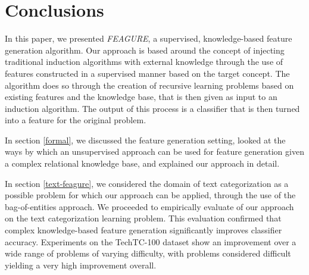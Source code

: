 \documentclass{article}
\theoremstyle{definition}
\begin{document}



\section{Conclusions}

In this paper, we presented \emph{FEAGURE}, a supervised, knowledge-based feature generation algorithm. Our approach is based around the concept of injecting traditional induction algorithms with external knowledge through the use of features constructed in a supervised manner based on the target concept. 
The algorithm does so through the creation of recursive learning problems based on existing features and the knowledge base, that is then given as input to an induction algorithm. The output of this process is a classifier that is then turned into a feature for the original problem.

In section \ref{formal}, we discussed the feature generation setting, looked at the ways by which an unsupervised approach can be used for feature generation given a complex relational knowledge base, and explained our approach in detail.

In section \ref{text-feagure}, we considered the domain of text categorization as a possible problem for which our approach can be applied, through the use of the bag-of-entities approach. We proceeded to empirically evaluate of our approach on the text categorization learning problem.
This evaluation confirmed that complex knowledge-based feature generation significantly improves classifier accuracy. Experiments on the TechTC-100 dataset show an improvement over a wide range of problems of varying difficulty, with problems considered difficult yielding a very high improvement overall.
\end{document}
